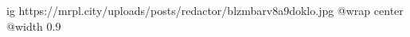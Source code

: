  
 
 
 
 

\ifcmt
  ig https://mrpl.city/uploads/posts/redactor/blzmbarv8a9doklo.jpg
  @wrap center
  @width 0.9
\fi
